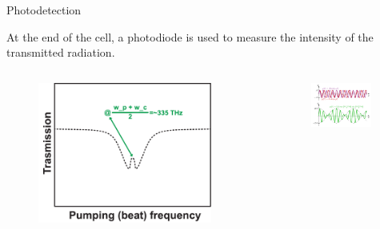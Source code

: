 \begin{frame}{Photodetection}

    At the end of the cell, a photodiode is used to measure the intensity of the transmitted radiation.

    \begin{columns}[c, onlytextwidth]

        \begin{column}{0.45\textwidth}

            \begin{figure}
                \centering
                \includegraphics[width=0.9\textwidth]{pdf/CPT-trasmission-curve.pdf}
            \end{figure}

        \end{column}

        \begin{column}{0.55\textwidth}

            \begin{figure}
                \centering
                \includegraphics[width=0.9\textwidth]{pdf/beating-waves.pdf}
            \end{figure}


\end{column}
\end{columns}
\end{frame}
